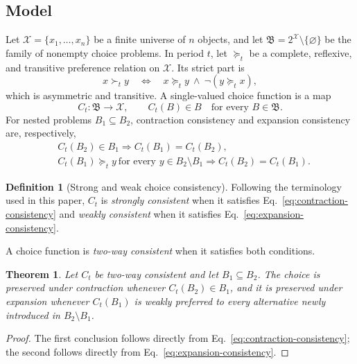 \documentclass[conference]{IEEEtran}
\theoremstyle{plain}
\newtheorem{theorem}{Theorem}
\theoremstyle{definition}
\newtheorem{definition}{Definition}
\theoremstyle{remark}
\begin{document}
		\subsection{Model}
		Let $\mathcal X=\{x_1,\ldots,x_n\}$ be a finite universe of $n$ objects, and let $\mathfrak B=2^{\mathcal X}\setminus\{\varnothing\}$ be the family of nonempty choice problems. In period $t$, let $\succcurlyeq_t$ be a complete, reflexive, and transitive preference relation on $\mathcal X$. Its strict part is
		\begin{equation}
			x\succ_t y
			\quad\Longleftrightarrow\quad
			x\succcurlyeq_t y\ \land\ \neg(y\succcurlyeq_t x),
		\end{equation}
		which is asymmetric and transitive. A single-valued choice function is a map
		\begin{equation}
			C_t:\mathfrak B\longrightarrow\mathcal X,
			\qquad C_t(B)\in B\quad\text{for every }B\in\mathfrak B.
		\end{equation}
		For nested problems $B_1\subseteq B_2$, contraction consistency and expansion consistency are, respectively,
		\begin{align}
		&C_t(B_2)\in B_1
		\Longrightarrow C_t(B_1)=C_t(B_2),\label{eq:contraction-consistency}\\
		&C_t(B_1)\succcurlyeq_t y\ \text{for every }y\in B_2\setminus B_1
		\Longrightarrow C_t(B_2)=C_t(B_1).\label{eq:expansion-consistency}
		\end{align}
		\begin{definition}[Strong and weak choice consistency]
			Following the terminology used in this paper, $C_t$ is \emph{strongly consistent} when it satisfies Eq.~\eqref{eq:contraction-consistency} and \emph{weakly consistent} when it satisfies Eq.~\eqref{eq:expansion-consistency}.
		\end{definition}
		A choice function is \emph{two-way consistent} when it satisfies both conditions.
		\begin{theorem}\label{14}
			Let $C_t$ be two-way consistent and let $B_1\subseteq B_2$. The choice is preserved under contraction whenever $C_t(B_2)\in B_1$, and it is preserved under expansion whenever $C_t(B_1)$ is weakly preferred to every alternative newly introduced in $B_2\setminus B_1$.
		\end{theorem}
		\begin{proof}
			The first conclusion follows directly from Eq.~\eqref{eq:contraction-consistency}; the second follows directly from Eq.~\eqref{eq:expansion-consistency}.
		\end{proof}
\end{document}

